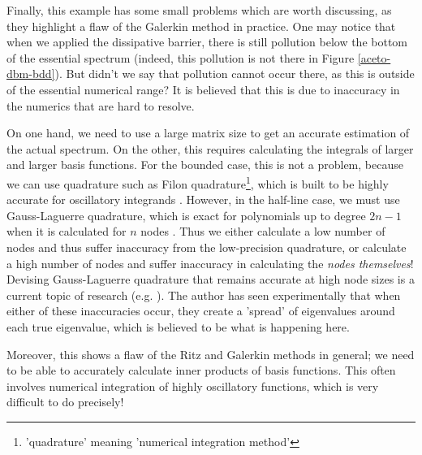 \documentclass[../main.tex]{subfiles}
\begin{document}
Finally, this example has some small problems which are worth discussing, as they highlight
a flaw of the Galerkin method in practice. One may notice that when we applied the dissipative barrier,
there is still pollution below the bottom of the essential spectrum (indeed, this pollution
is not there in Figure \ref{aceto-dbm-bdd}). But didn't we say that pollution cannot occur there,
as this is outside of the essential numerical range? It is believed that this is due to inaccuracy
in the numerics that are hard to resolve. 

On one hand, we need to use a large matrix size to
get an accurate estimation of the actual spectrum. On the other, this requires calculating
the integrals of larger and larger basis functions. For the bounded case, this is not a problem,
because we can use quadrature such as Filon quadrature\footnote{'quadrature' meaning 'numerical
integration method'}, which is built to be highly accurate
for oscillatory integrands \cite{chase1969algorithm}. However, in the half-line case, we must
use Gauss-Laguerre quadrature, which is exact for polynomials up to degree $2n-1$ when it is
calculated for $n$ nodes \cite{suli2003introduction}. Thus we either calculate a low number
of nodes and thus suffer inaccuracy from the low-precision quadrature, or calculate a high
number of nodes and suffer inaccuracy in calculating the \emph{nodes themselves}! Devising
Gauss-Laguerre quadrature that remains accurate at high node sizes is a current topic of
research (e.g. \cite{gil2019fast}). The author has seen experimentally that when either of
these inaccuracies occur, they create a 'spread' of eigenvalues around each true eigenvalue,
which is believed to be what is happening here.

Moreover, this shows a flaw of the Ritz and Galerkin methods in general; we need to be able to
accurately calculate inner products of basis functions. This often involves numerical integration
of highly oscillatory functions, which is very difficult to do precisely!
\end{document}
